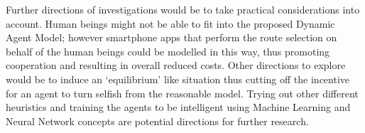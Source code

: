 \documentclass[11pt, letterpaper]{article}
\begin{document}
Further directions of investigations would be to take practical considerations into account. Human beings might not be able to fit into the proposed Dynamic Agent Model; however smartphone apps that perform the route selection on behalf of the human beings could be modelled in this way, thus promoting cooperation and resulting in overall reduced costs. Other directions to explore would be to induce an `equilibrium' like situation thus cutting off the incentive for an agent to turn selfish from the reasonable model. Trying out other different heuristics and training the agents to be intelligent using Machine Learning and Neural Network concepts are potential directions for further research. 





\end{document}

